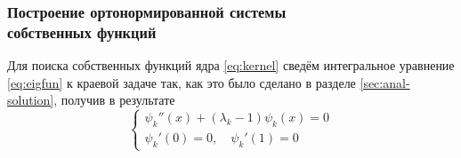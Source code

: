 \documentclass{article}
\numberwithin{equation}{section}
\begin{document}
\subsubsection{Построение ортонормированной системы\\
  собственных функций}

Для поиска собственных функций ядра \eqref{eq:kernel} сведём
интегральное уравнение \eqref{eq:eigfun} к краевой задаче так, как это
было сделано в разделе \ref{sec:anal-solution}, получив в результате
\begin{equation}
  \label{eq:eig-boundary}
  \begin{cases}
    \psi_k''(x)+(\lambda_k-1)\psi_k(x)=0 \\
    \psi_k'(0) = 0, \quad \psi_k'(1)=0
  \end{cases}
\end{equation}
\end{document}
